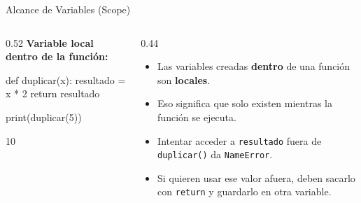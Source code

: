 \documentclass[aspectratio=169, 11pt]{beamer}
\begin{document}
\begin{frame}[fragile,shrink=28]{Alcance de Variables (Scope)}
  \vspace{-6pt}
  \begin{columns}[T]
    \begin{column}{0.52\textwidth}
      {\footnotesize\color{arcaDark}\bfseries Variable local dentro de la función:}
      \vspace{2pt}
      \begin{pyblock}
def duplicar(x):
    resultado = x * 2
    return resultado

print(duplicar(5))
      \end{pyblock}
      \vspace{-2pt}
      \begin{outputblock}
10
      \end{outputblock}
    \end{column}

    \begin{column}{0.44\textwidth}
      \vspace{2pt}
      {\scriptsize\color{textMuted}
      \begin{itemize}\setlength{\itemsep}{4pt}
        \item[{\color{arcaRed}\scriptsize\faArrowRight}]
          Las variables creadas \textbf{dentro}
          de una función son \textbf{locales}.
        \item[{\color{arcaRed}\scriptsize\faArrowRight}]
          Eso significa que solo existen mientras
          la función se ejecuta.
        \item[{\color{arcaRed}\scriptsize\faExclamationTriangle}]
          Intentar acceder a \texttt{resultado}
          fuera de \texttt{duplicar()} da
          \texttt{NameError}.
        \item[{\color{arcaRed}\scriptsize\faLightbulb}]
          Si quieren usar ese valor afuera,
          deben sacarlo con \texttt{return}
          y guardarlo en otra variable.
      \end{itemize}
      }
    \end{column}
  \end{columns}
\end{frame}
\end{document}
